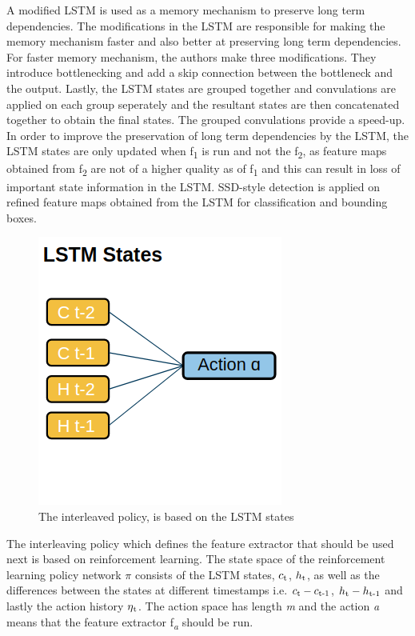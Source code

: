 \documentclass[conference]{IEEEtran}
\begin{document}
A modified LSTM \cite{b18} is used as a memory mechanism to preserve long term dependencies. The modifications in the LSTM are responsible for making the memory mechanism faster and also better at preserving long term dependencies. For faster memory mechanism, the authors make three modifications. They introduce bottlenecking and add a skip connection between the bottleneck and the output. Lastly, the LSTM states are grouped together and convulations are applied on each group seperately and the resultant states are then concatenated together to obtain the final states. The grouped convulations provide a speed-up. In order to improve the preservation of long term dependencies by the LSTM, the LSTM states are only updated when f\textsubscript{1} is run and not the f\textsubscript{2}, as feature maps obtained from f\textsubscript{2} are not of a higher quality as of f\textsubscript{1} and this can result in loss of important state information in the LSTM. \newline
SSD-style \cite{b17} detection is applied on refined feature maps obtained from the LSTM for classification and bounding boxes. \newline

\begin{figure}[h]
\centering
\includegraphics[width=0.33\columnwidth]{interleaved-policy}
\caption{The interleaved policy, is based on the LSTM states}
\end{figure}

The interleaving policy which defines the feature extractor that should be used next is based on reinforcement learning. The state space of the reinforcement learning policy network $\pi$ consists of the LSTM states, $c\textsubscript{t}$, $h\textsubscript{t}$, as well as the differences between the states at different timestamps i.e. $c\textsubscript{t}-c\textsubscript{t-1}$, $h\textsubscript{t}-h\textsubscript{t-1}$ and lastly the action history $\eta\textsubscript{t}$. The action space has length \textit{m} and the action \textit{a} means that the feature extractor f\textsubscript{\textit{a}} should be run. \newline
\end{document}
